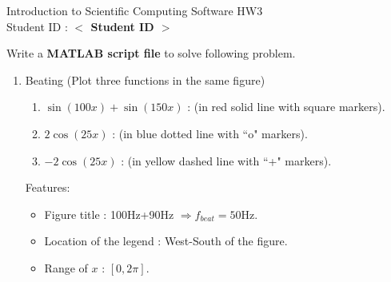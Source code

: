 \documentclass[12pt,a4paper]{article}
\newcommand{\placeholder}[1]{\textbf{$<$ #1 $>$}}
\newcommand{\idnumber}{\placeholder{Student ID}}
\begin{document}
\begin{flushleft}Introduction to Scientific Computing Software HW3
\\Student ID : \idnumber{}\end{flushleft}

Write a \textbf{MATLAB script file} to solve following problem.
\begin{enumerate}
\item Beating (Plot three functions in the same figure)
\begin{enumerate} 
\item $\sin(100x)+\sin(150x)$ : (in red solid line with square markers).

\item $2\cos(25x)$ : (in blue dotted line with ``o" markers).
\item $-2\cos(25x)$ : (in yellow dashed line with ``+" markers).
\end{enumerate}
Features:
\begin{itemize}
\item Figure title : 100Hz+90Hz $\Rightarrow f_{beat}=50$Hz.
\item Location of the legend : West-South of the figure.
\item Range of $x $ : $[0,2\pi]$.
\end{itemize}
\end{enumerate}
\end{document}
